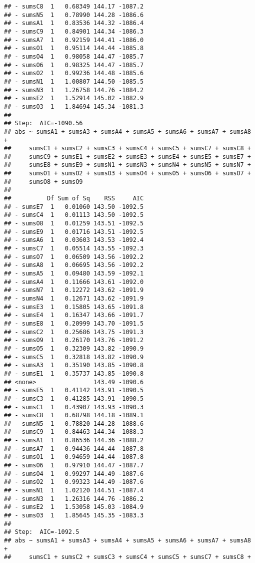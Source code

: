 \documentclass[,man,floatsintext]{apa6}
\begin{document}
\begin{verbatim}
## - sumsC8  1   0.68349 144.17 -1087.2
## - sumsN5  1   0.78990 144.28 -1086.6
## - sumsA1  1   0.83536 144.32 -1086.4
## - sumsC9  1   0.84901 144.34 -1086.3
## - sumsA7  1   0.92159 144.41 -1086.0
## - sumsO1  1   0.95114 144.44 -1085.8
## - sumsO4  1   0.98058 144.47 -1085.7
## - sumsO6  1   0.98325 144.47 -1085.7
## - sumsO2  1   0.99236 144.48 -1085.6
## - sumsN1  1   1.00807 144.50 -1085.5
## - sumsN3  1   1.26758 144.76 -1084.2
## - sumsE2  1   1.52914 145.02 -1082.9
## - sumsO3  1   1.84694 145.34 -1081.3
## 
## Step:  AIC=-1090.56
## abs ~ sumsA1 + sumsA3 + sumsA4 + sumsA5 + sumsA6 + sumsA7 + sumsA8 + 
##     sumsC1 + sumsC2 + sumsC3 + sumsC4 + sumsC5 + sumsC7 + sumsC8 + 
##     sumsC9 + sumsE1 + sumsE2 + sumsE3 + sumsE4 + sumsE5 + sumsE7 + 
##     sumsE8 + sumsE9 + sumsN1 + sumsN3 + sumsN4 + sumsN5 + sumsN7 + 
##     sumsO1 + sumsO2 + sumsO3 + sumsO4 + sumsO5 + sumsO6 + sumsO7 + 
##     sumsO8 + sumsO9
## 
##          Df Sum of Sq    RSS     AIC
## - sumsE7  1   0.01060 143.50 -1092.5
## - sumsC4  1   0.01113 143.50 -1092.5
## - sumsO8  1   0.01259 143.51 -1092.5
## - sumsE9  1   0.01716 143.51 -1092.5
## - sumsA6  1   0.03603 143.53 -1092.4
## - sumsC7  1   0.05514 143.55 -1092.3
## - sumsO7  1   0.06509 143.56 -1092.2
## - sumsA8  1   0.06695 143.56 -1092.2
## - sumsA5  1   0.09480 143.59 -1092.1
## - sumsA4  1   0.11666 143.61 -1092.0
## - sumsN7  1   0.12272 143.62 -1091.9
## - sumsN4  1   0.12671 143.62 -1091.9
## - sumsE3  1   0.15805 143.65 -1091.8
## - sumsE4  1   0.16347 143.66 -1091.7
## - sumsE8  1   0.20999 143.70 -1091.5
## - sumsC2  1   0.25686 143.75 -1091.3
## - sumsO9  1   0.26170 143.76 -1091.2
## - sumsO5  1   0.32309 143.82 -1090.9
## - sumsC5  1   0.32818 143.82 -1090.9
## - sumsA3  1   0.35190 143.85 -1090.8
## - sumsE1  1   0.35737 143.85 -1090.8
## <none>                143.49 -1090.6
## - sumsE5  1   0.41142 143.91 -1090.5
## - sumsC3  1   0.41285 143.91 -1090.5
## - sumsC1  1   0.43907 143.93 -1090.3
## - sumsC8  1   0.68798 144.18 -1089.1
## - sumsN5  1   0.78820 144.28 -1088.6
## - sumsC9  1   0.84463 144.34 -1088.3
## - sumsA1  1   0.86536 144.36 -1088.2
## - sumsA7  1   0.94436 144.44 -1087.8
## - sumsO1  1   0.94659 144.44 -1087.8
## - sumsO6  1   0.97910 144.47 -1087.7
## - sumsO4  1   0.99297 144.49 -1087.6
## - sumsO2  1   0.99323 144.49 -1087.6
## - sumsN1  1   1.02120 144.51 -1087.4
## - sumsN3  1   1.26316 144.76 -1086.2
## - sumsE2  1   1.53058 145.03 -1084.9
## - sumsO3  1   1.85645 145.35 -1083.3
## 
## Step:  AIC=-1092.5
## abs ~ sumsA1 + sumsA3 + sumsA4 + sumsA5 + sumsA6 + sumsA7 + sumsA8 + 
##     sumsC1 + sumsC2 + sumsC3 + sumsC4 + sumsC5 + sumsC7 + sumsC8 + 

\end{verbatim}
\end{document}
